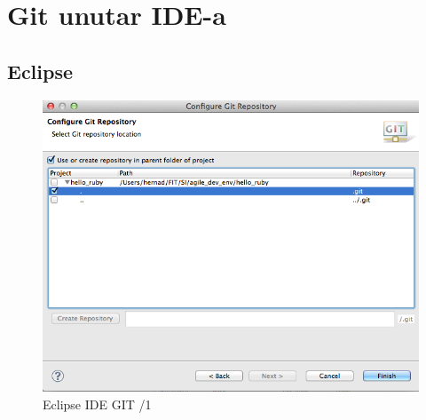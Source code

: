 \documentclass[times, utf8, seminar]{fit}
\begin{document}
\section{Git unutar IDE-a}




\subsection{Eclipse}


\begin{figure}[H]
\centering
\includegraphics[width=15cm]{img/eclipse_git_01.png}
\caption{Eclipse IDE GIT /1}
\end{figure}
\end{document}
